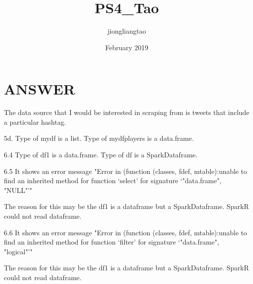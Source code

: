 \documentclass{article}
\title{PS4_Tao}
\author{jiongliangtao }
\date{February 2019}
\begin{document}
\maketitle

\section{ANSWER}

The data source that I would be interested in scraping from is tweets that include a particular hashtag.

5d. Type of mydf is a list. Type of mydfplayers is a data.frame. 

6.4 Type of df1 is a data.frame.
    Type of df is a SparkDataframe. 
    
6.5 It shows an error message "Error in (function (classes, fdef, mtable):unable to find an inherited method for function ‘select’ for signature ‘"data.frame", "NULL"’"

  The reason for this may be the df1 is a dataframe but a SparkDataframe. SparkR could not read dataframe. 
  
6.6 It shows an error message "Error in (function (classes, fdef, mtable):unable to find an inherited method for function ‘filter’ for signature ‘"data.frame", "logical"’"

  The reason for this may be the df1 is a dataframe but a SparkDataframe. SparkR could not read dataframe. 
\end{document}

